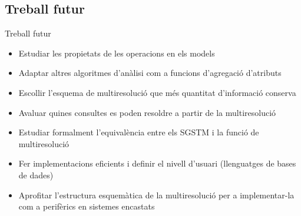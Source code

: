 \subsection*{Treball futur}
\begin{frame}{Treball futur}

  \begin{itemize}

   \item Estudiar les propietats de les operacions en els models
   \item Adaptar altres algoritmes d'anàlisi com a funcions d'agregació d'atributs
   \item Escollir l'esquema de multiresolució que més quantitat d'informació conserva
   \item Avaluar quines consultes es poden resoldre a partir de la multiresolució
   \item Estudiar formalment l'equivalència  entre els SGSTM i la funció de multiresolució
   \item Fer implementacions eficients i definir el nivell d’usuari (llenguatges de bases de dades)
   \item Aprofitar l'estructura esquemàtica de la multiresolució per a implementar-la com a perifèrics en sistemes encastats
  \end{itemize}

\end{frame}



